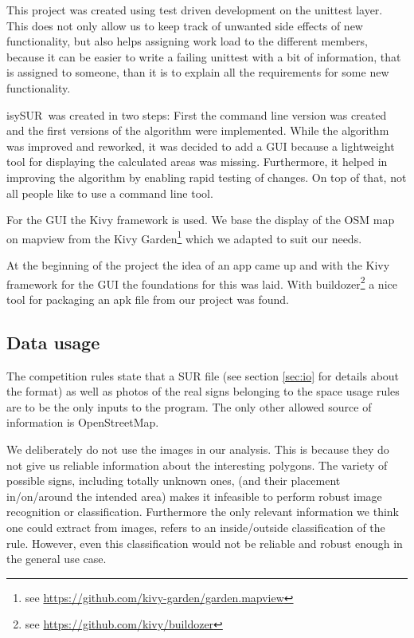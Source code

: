 \documentclass[11pt,fleqn]{book} %
\newcommand{\ProjectTitle}{isySUR}
\newcommand{\pt}{\ProjectTitle}
\begin{document}
This project was created using test driven development on the unittest layer. This does not only allow us to keep track of unwanted side effects of new functionality, but also helps assigning work load to the different members, because it can be easier to write a failing unittest with a bit of information, that is assigned to someone, than it is to explain all the requirements for some new functionality.

\pt\ was created in two steps: First the command line version was created and the first versions of the algorithm were implemented. While the algorithm was improved and reworked, it was decided to add a GUI because a lightweight tool for displaying the calculated areas was missing. Furthermore, it helped in improving the algorithm by enabling rapid testing of changes. On top of that, not all people like to use a command line tool.

For the GUI the Kivy framework is used. We base the display of the OSM map on mapview from the Kivy Garden\footnote{see \url{https://github.com/kivy-garden/garden.mapview}} which we adapted to suit our needs.

At the beginning of the project the idea of an app came up and with the Kivy framework for the GUI the foundations for this was laid. With buildozer\footnote{see \url{https://github.com/kivy/buildozer}} a nice tool for packaging an apk file from our project was found.

\subsection{Data usage}\label{sec:data_usage}
The competition rules state that a SUR file (see section \ref{sec:io} for details about the format) as well as photos of the real signs belonging to the space usage rules are to be the only inputs to the program. The only other allowed source of information is OpenStreetMap. 

We deliberately do not use the images in our analysis. This is because they do not give us reliable information about the interesting polygons. The variety of possible signs, including totally unknown ones, (and their placement in/on/around the intended area) makes it infeasible to perform robust image recognition or classification. Furthermore the only relevant information we think one could extract from images, refers to an inside/outside classification of the rule. However, even this classification would not be reliable and robust enough in the general use case.
\end{document}
